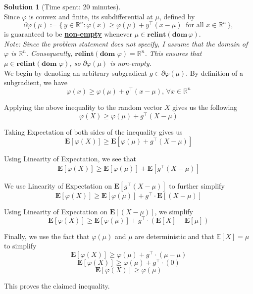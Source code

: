 \documentclass[11pt, reqno, letterpaper, twoside]{amsart}
\theoremstyle{plain}
\theoremstyle{definition}
\newtheorem{solution}[theorem]{Solution}
\begin{document}
\clearpage
\begin{solution}[Time spent: 20 minutes] \\
Since $\varphi$ is convex and finite, its subdifferential at $\mu$, defined by  
\[
\partial \varphi(\mu) := \{\, y \in \mathbb{R}^n : \varphi(x) \geq \varphi(\mu) + y^\top (x - \mu) \;\; \text{for all } x \in \mathbb{R}^n \,\},
\]  
is guaranteed to be \textbf{\underline{non-empty}} whenever $\mu \in \textbf{relint}(\textbf{dom}\,\varphi)$. \\


\noindent \textit{Note: Since the problem statement does not specify, I assume that the domain of $\varphi$ is $\mathbb{R}^n$. Consequently, $\textbf{relint}(\textbf{dom } \varphi) = \mathbb{R}^n$. This ensures that $\mu \in \textbf{relint}(\textbf{dom } \varphi)$, so $\partial \varphi(\mu)$ is non-empty.} \\

\noindent We begin by denoting an arbitrary subgradient $g \in \partial \varphi(\mu)$. By definition of a subgradient, we have
\[
\varphi(x)\ge \varphi(\mu)+ g^\top \left(x-\mu\right),\, \forall x \in \mathbb{R}^n
\]

Applying the above inequality to the random vector \(X\) gives us the following
\[
\varphi(X)\ge \varphi(\mu)+ g^\top \left(X-\mu\right)
\]

Taking Expectation of both sides of the inequality gives us 
\[
\mathbf{E} \left[ \varphi(X) \right]\ge \mathbf{E} \left[ \varphi(\mu)+ g^\top \left(X-\mu\right) \right]
\]

Using Linearity of Expectation, we see that
\[
\mathbf{E} \left[ \varphi(X) \right]\ge \mathbf{E} \left[ \varphi(\mu) \right] + \mathbf{E} \left[ g^\top \left(X-\mu\right) \right]
\]

We use Linearity of Expectation on $\mathbf{E} \left[ g^\top \left(X-\mu\right) \right]$ to further simplify
\[
\mathbf{E} \left[ \varphi(X) \right]\ge \mathbf{E} \left[ \varphi(\mu) \right] + g^\top \cdot \mathbf{E} \left[\left(X-\mu\right) \right]
\]

Using Linearity of Expectation on $\mathbf{E} \left[\left(X-\mu\right) \right]$, we simplify 
\[
\mathbf{E} \left[ \varphi(X) \right]\ge \mathbf{E} \left[ \varphi(\mu) \right] + g^\top \cdot \left( \mathbf{E} \left[X \right] - \mathbf{E} \left[\mu \right] \right)
\]

Finally, we use the fact that $\varphi(\mu)$ and $\mu$ are deterministic and that \(\mathbb{E}[X]=\mu\) to simplify
\[
\mathbf{E} \left[ \varphi(X) \right]\ge \varphi(\mu) + g^\top \cdot \left( \mu - \mu \right)
\]
\[
\mathbf{E} \left[ \varphi(X) \right]\ge \varphi(\mu) + g^\top \cdot \left( 0 \right)
\]
\[
\mathbf{E} \left[ \varphi(X) \right]\ge \varphi(\mu)
\]

This proves the claimed inequality.

\end{solution}
\end{document}
